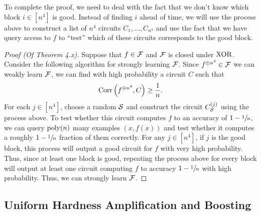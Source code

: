 \documentclass[11pt]{article}
\begin{document}
To complete the proof, we need to deal with the fact that we don't know which block $i \in [n^4]$ is good. Instead of finding $i$ ahead of time, we will use the process above to construct a list of $n^4$ circuits $C_1, \ldots, C_{n^4}$ and use the fact that we have query access to $f$ to ``test'' which of these circuits corresponds to the good block.

\begin{proof}[Proof \textup{(Of Theorem 4.x)}]
    Suppose that $f \in \mathcal{F}$ and $\mathcal{F}$ is closed under $\textup{XOR}{}$. Consider the following algorithm for strongly learning $\mathcal{F}$. Since $f^{\oplus n^4} \in \mathcal{F}$ we can weakly learn $\mathcal{F}$, we can find with high probability a circuit $C$ such that 
    \begin{equation*}
        \mathrm{Corr}\left(f^{\oplus n^4}, C\right) \geq \frac{1}{n}.
    \end{equation*}
    For each $j \in [n^4]$, choose a random $\mathcal{S}$ and construct the circuit $C_{\mathcal{S}}^{(j)}$ using the process above. To test whether this circuit computes $f$ to an accuracy of $1 - \sfrac{1}{n}$, we can query $\mathrm{poly}(n)$ many examples $(x, f(x))$ and test whether it computes a roughly $1 - \sfrac{1}{n}$ fraction of them correctly. For any $j \in [n^4]$, if $j$ is the good block, this process will output a good circuit for $f$ with very high probability. Thus, since at least one block is good, repeating the process above for every block will output at least one circuit computing $f$ to accuracy $1 - \sfrac{1}{n}$ with high probability. Thus, we can strongly learn $\mathcal{F}$.
\end{proof}


\subsection{Uniform Hardness Amplification and Boosting}




\end{document}
